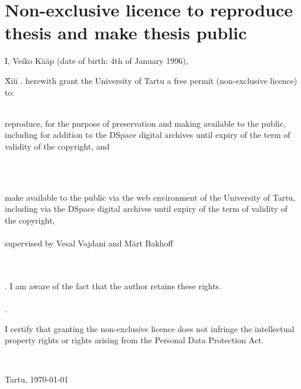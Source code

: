 \documentclass{style/bachelor-thesis}
\begin{document}
\section*{\small Non-exclusive licence to reproduce thesis and make thesis public}


I, Veiko Kääp (date of birth: 4th of January 1996),

\begin{tabbing}
  \= Xiii\=\kill
  . \> herewith grant the University of Tartu a free permit (non-exclusive licence) to:\\\\ 

  \> 
  \begin{minipage}[t]{14.2cm}
    reproduce, for the purpose of preservation and making available to the public, including for addition to the DSpace digital archives until expiry of the term of validity of the copyright, and
  \end{minipage}
  \\\\
  \begin{minipage}[t]{14.2cm}
    make available to the public via the web environment of the University of Tartu, including via the DSpace digital archives until expiry of the term of validity of the copyright,\\ 

    \articleName\\   

    supervised by Vesal Vojdani and Märt Bakhoff

  \end{minipage}\\\\ 
  . \>I am aware of the fact that the author retains these rights.\\\\
  . \>
  \begin{minipage}[t]{14.2cm}
    I certify that granting the non-exclusive licence does not infringe the intellectual property rights or rights arising from the Personal Data Protection Act. 
  \end{minipage}\\
\end{tabbing}

\noindent
Tartu, \today
\end{document}
